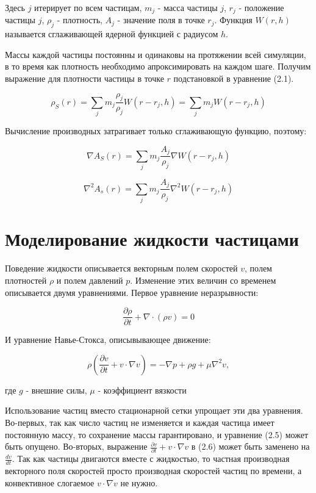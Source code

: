 Здесь $j$ итерирует по всем частицам, $m_j$ - масса частицы $j$, $r_j$ -
положение частицы $j$, $\rho_j$ - плотность, $A_j$ - значение поля в точке
$r_j$.
Функция $W(r, h)$ называется сглаживающей ядерной функцией с радиусом $h$.


Массы каждой частицы постоянны и одинаковы на протяжении всей симуляции, в то
время как плотность необходимо апроксимировать на каждом шаге. Получим выражение
для плотности частицы в точке $r$ подстановкой в уравнение (2.1).

\begin{equation}
	\rho_S(r) = \sum_j m_j \frac{\rho_j}{\rho_j} W(r - r_j, h) = \sum_j m_j W(r -
	r_j, h)
\end{equation}

Вычисление производных затрагивает только сглаживающую функцию, поэтому:

\begin{equation}
	\nabla A_S(r) = \sum_j m_j \frac{A_j}{\rho_j} \nabla W(r - r_j, h)
\end{equation}


\begin{equation}
	\nabla^2 A_s(r) = \sum_j m_j \frac{A_j}{\rho_j} \nabla^2 W(r - r_j, h)
\end{equation}

\section{Моделирование жидкости частицами}

Поведение жидкости описывается векторным полем скоростей $v$, полем плотностей
$\rho$ и полем давлений $p$. Изменение этих величин со временем описывается двумя уравнениями. Первое уравнение неразрывности:

\begin{equation}
	\frac{\partial \rho}{\partial t} + \nabla \cdot (\rho v) = 0
\end{equation}

И уравнение Навье-Стокса, описывывающее движение:

\begin{equation}
	\rho(\frac{\partial v}{\partial t} + v \cdot \nabla v) = - \nabla p + \rho g +
	\mu \nabla^2 v,
\end{equation}

где $g$ - внешние силы, $\mu$ - коэффициент вязкости

Использование частиц вместо стационарной сетки упрощает эти два уравнения.
Во-первых, так как число частиц не изменяется и каждая частица имеет постоянную массу, то
сохранение массы гарантировано, и уравнение (2.5) может быть опущено.
Во-вторых, выражение $\frac{\partial v}{\partial t} + v \cdot \nabla v$ в (2.6)
может быть заменено на $\frac{dv}{dt}$. Так как частицы двигаются вместе с
жидкостью, то частная производная векторного поля скоростей просто производная
скоростей частиц по времени, а конвективное слогаемое $v \cdot \nabla v$ не
нужно.

